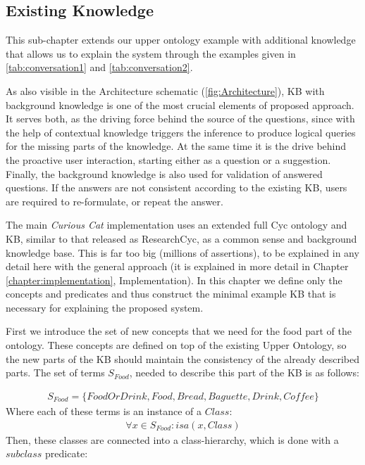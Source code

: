 \subsection{Existing Knowledge}
\label{section:existingKB}
This sub-chapter extends our upper ontology example with additional knowledge
that allows us to explain the system through the examples given in 
\autoref{tab:conversation1} and \autoref{tab:conversation2}. 

As also visible in the Architecture schematic (\autoref{fig:Architecture}),
KB with background knowledge is one of the most crucial elements of proposed 
approach. It serves both, as the driving force behind the source of the 
questions, since with the help of contextual knowledge triggers the inference to
produce logical queries for the missing parts of the knowledge. At the same time
it is the drive behind the proactive user interaction, starting either as a
question or a suggestion. Finally, the background knowledge is also used for 
validation of answered questions. If the answers are not consistent according
to the existing KB, users are required to re-formulate, or repeat the answer.

The main \emph{Curious Cat} implementation uses an extended 
full Cyc ontology and KB, similar to that released as ResearchCyc, as a 
common sense and background knowledge base. This is far too big (millions of 
assertions), to be explained in any detail here with the general approach (it 
is explained in more detail in Chapter \ref{chapter:implementation}, 
Implementation). In this chapter we define only the concepts and predicates 
and thus construct the minimal example KB that is necessary for explaining the
proposed system.

First we introduce the set of new concepts that we need for the food part
of the ontology. These concepts are defined on top of the existing Upper 
Ontology, so the new parts of the KB should maintain the consistency of the
already described parts. The set of terms $S_{Food} $, needed to describe this 
part of the KB is as follows:

\begin{equation}\label{set:foodTerms}
\begin{gathered}
S_{Food} = \{FoodOrDrink,Food,Bread,Baguette,Drink,Coffee\}
\end{gathered}
\end{equation}
Where each of these terms is an instance of a $Class$:
\begin{equation}\label{set:foodTermsClass}
\begin{gathered}
\forall x \in S_{Food}: isa(x,Class)
\end{gathered}
\end{equation}
Then, these classes are connected into a class-hierarchy, which is done with
a $subclass$ predicate:

